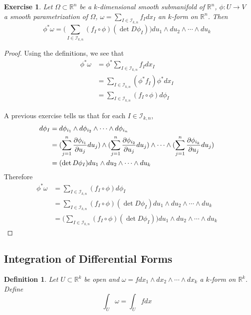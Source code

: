 \documentclass[12pt]{amsart}
\newtheorem{defn}[thm]{Definition}
\newtheorem{ex}[thm]{Exercise}
\newcommand{\om}{\omega}
\newcommand{\Om}{\Omega}
\newcommand{\R}{\mathbb{R}}
\newcommand{\MI}{\mathcal{I}}
\begin{document}
	\begin{ex}
			Let $\Om \subset \R^n$ be a $k$-dimensional smooth submanifold of $\R^n$, $\phi: U \rightarrow V$ a smooth parametrization of $\Om$, $\om = \sum_{I \in \MI_{k,n}} f_Idx_I$  an $k$-form on $\R^n$. Then $$\phi^* \om = \bigg( \sum_{I \in \MI_{k, n}} (f_I \circ \phi) (\det D\phi_I)\bigg)du_1 \wedge du_2 \wedge \cdots \wedge du_k$$ 
	\end{ex}

	\begin{proof}
		Using the definitions, we see that 
		\begin{align*}
			\phi^* \om 
			&= \phi^*  \sum_{I \in \MI_{k,n}} f_Idx_I \\
			&= \sum_{I \in \MI_{k,n}} (\phi^*f_I) \phi^*dx_I \\
			&= \sum_{I \in \MI_{k,n}} (f_I \circ  \phi)  d\phi_I
		\end{align*}
	
	A previous exercise tells us that for each $I \in \MI_{k,n}$,
	\begin{align*}
		d \phi_I 
		&= d\phi_{i_1} \wedge d\phi_{i_2} \wedge \cdots \wedge d \phi_{i_n} \\
		&= (\sum_{j = 1}^n \pdv{\phi_{i_1}}{u_j} du_j) \wedge (\sum_{j = 1}^n \pdv{\phi_{i_2}}{u_j} du_j) \wedge \cdots \wedge (\sum_{j = 1}^n \pdv{\phi_{i_k}}{u_j} du_j)   \\
		&= (\det D\phi_I)du_1 \wedge du_2 \wedge \cdots \wedge du_k
	\end{align*}
	Therefore 
	\begin{align*}
		\phi^* \om
		&= \sum_{I \in \MI_{k,n}} (f_I \circ  \phi)  d\phi_I \\
		&= \sum_{I \in \MI_{k,n}} (f_I \circ  \phi)  (\det D\phi_I)du_1 \wedge du_2 \wedge \cdots \wedge du_k \\
		&= \bigg(\sum_{I \in \MI_{k,n}} (f_I \circ  \phi)  (\det D\phi_I)\bigg)du_1 \wedge du_2 \wedge \cdots \wedge du_k
	\end{align*}
	\end{proof}
	
	\subsection{Integration of Differential Forms}
	
	\begin{defn}
		Let $U \subset \R^k$ be open and $\om = f dx_1 \wedge dx_2 \wedge \cdots \wedge dx_k$ a $k$-form on $\R^k$. Define $$\int_U \om = \int_U f dx$$
	\end{defn}
	
\end{document}
